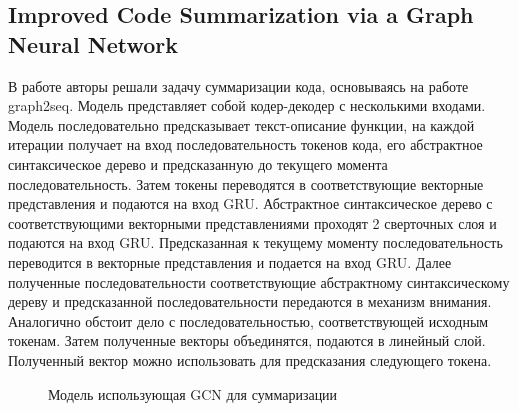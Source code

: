 \subsection{Improved Code Summarization via a Graph Neural Network}
В работе\cite{leclair2020improved} авторы решали задачу суммаризации кода, основываясь на работе graph2seq. Модель представляет собой кодер-декодер с несколькими входами. Модель последовательно предсказывает текст-описание функции, на каждой итерации получает на вход последовательность токенов кода, его абстрактное синтаксическое дерево и предсказанную до текущего момента последовательность. Затем токены переводятся в соответствующие векторные представления и подаются на вход GRU. Абстрактное синтаксическое дерево с соответствующими векторными представлениями проходят 2 сверточных слоя и подаются на вход GRU. Предсказанная к текущему моменту последовательность переводится в векторные представления и подается на вход GRU. Далее полученные последовательности соответствующие абстрактному синтаксическому дереву и предсказанной последовательности передаются в механизм внимания. Аналогично обстоит дело с последовательностью, соответствующей исходным токенам. Затем полученные векторы объединятся, подаются в линейный слой. Полученный вектор можно использовать для предсказания следующего токена.
\begin{figure}[h]
    \caption{Модель использующая GCN для суммаризации}
\end{figure}

